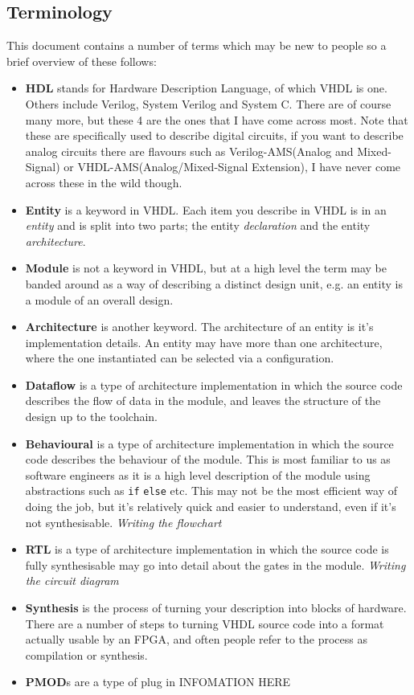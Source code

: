 \documentclass[11pt,a4paper]{article}
\newlength\myheight
\newlength\mydepth
\newcommand*\inlinegraphics[1]{%
  \settototalheight\myheight{Xygp}%
  \settodepth\mydepth{Xygp}%
  \raisebox{-\mydepth}{\texttt{[image: \#1]}}%
}
\newcommand{\handwaving}{\inlinegraphics{./src/hand.png}}
\begin{document}
\subsection{Terminology}
This document contains a number of terms which may be new to people so a brief overview of these follows:
\begin{itemize}
    \item \textbf{HDL} stands for Hardware Description Language, of which VHDL is one. Others include Verilog, System Verilog and System C. There are of course many more, but these 4 are the ones that I have come across most. Note that these are specifically used to describe digital circuits, if you want to describe analog circuits there are flavours such as Verilog-AMS(Analog and Mixed-Signal) or VHDL-AMS(Analog/Mixed-Signal Extension), I have never come across these in the wild though.
    \item \textbf{Entity} is a keyword in VHDL. Each item you describe in VHDL is in an \emph{entity} and is split into two parts; the entity \emph{declaration} and the entity \emph{architecture}.
    \item \textbf{Module} is not a keyword in VHDL, but at a high level the term may be banded around as a way of describing a distinct design unit, e.g. an entity is a module of an overall design.
    \item \textbf{Architecture} is another keyword. The architecture of an entity is it's implementation details. An entity may have more than one architecture, where the one instantiated can be selected via a configuration.
    \item \textbf{Dataflow} is a type of architecture implementation in which the source code describes the flow of data in the module, and leaves the structure of the design up to the toolchain.
    \item \textbf{Behavioural} is a type of architecture implementation in which the source code describes the behaviour of the module. This is most familiar to us as software engineers as it is a high level description of the module using abstractions such as \texttt{if} \texttt{else} etc. This may not be the most efficient way of doing the job, but it's relatively quick and easier to understand, even if it's not synthesisable. \emph{Writing the flowchart}
    \item \textbf{RTL} is a type of architecture implementation in which the source code is fully synthesisable may go into detail about the gates in the module. \emph{Writing the circuit diagram}
    \item \textbf{Synthesis} is the process of turning your description into blocks of hardware.\handwaving There are a number of steps to turning VHDL source code into a format actually usable by an FPGA, and often people refer to the process as compilation or synthesis. 
    \item \textbf{PMOD}s are a type of plug in INFOMATION HERE
\end{itemize}
\end{document}
